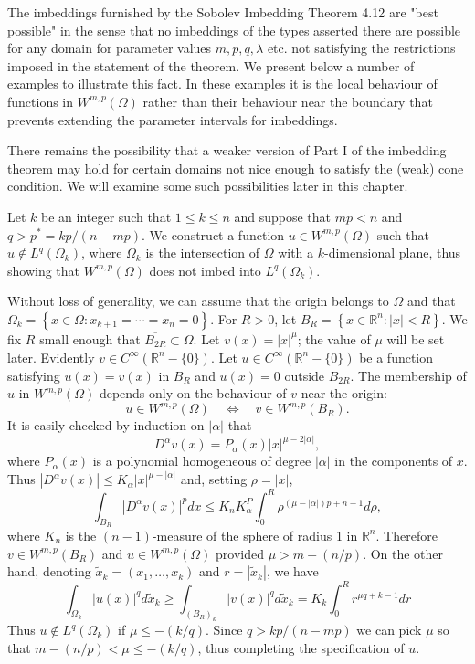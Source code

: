 \begin{para}
  The imbeddings furnished by the Sobolev Imbedding Theorem 4.12 are "best possible" in the sense that no imbeddings of the types asserted there are possible for any domain for parameter values $m, p, q, \lambda$ etc. not satisfying the restrictions imposed in the statement of the theorem. We present below a number of examples to illustrate this fact. In these examples it is the local behaviour of functions in $W^{m, p}(\Omega)$ rather than their behaviour near the boundary that prevents extending the parameter intervals for imbeddings.
  
  There remains the possibility that a weaker version of Part I of the imbedding theorem may hold for certain domains not nice enough to satisfy the (weak) cone condition. We will examine some such possibilities later in this chapter.
\end{para}


\begin{example}
  Let $k$ be an integer such that $1 \leq k \leq n$ and suppose that $m p<n$ and $q>p^*=k p /(n-m p)$. We construct a function $u \in W^{m, p}(\Omega)$ such that $u \notin L^q\left(\Omega_k\right)$, where $\Omega_k$ is the intersection of $\Omega$ with a $k$-dimensional plane, thus showing that $W^{m, p}(\Omega)$ does not imbed into $L^q\left(\Omega_k\right)$.
  
  Without loss of generality, we can assume that the origin belongs to $\Omega$ and that $\Omega_k=\left\{x \in \Omega: x_{k+1}=\cdots=x_n=0\right\}$. For $R>0$, let $B_R=\left\{x \in \mathbb{R}^n:|x|<R\right\}$. We fix $R$ small enough that $\overline{B_{2 R}} \subset \Omega$. Let $v(x)=|x|^\mu$; the value of $\mu$ will be set later. Evidently $v \in C^{\infty}\left(\mathbb{R}^n-\{0\}\right)$. Let $u \in C^{\infty}\left(\mathbb{R}^n-\{0\}\right)$ be a function satisfying $u(x)=v(x)$ in $B_R$ and $u(x)=0$ outside $B_{2 R}$. The membership of $u$ in $W^{m, p}(\Omega)$ depends only on the behaviour of $v$ near the origin:
  \[
  u \in W^{m, p}(\Omega) \quad \Longleftrightarrow \quad v \in W^{m, p}\left(B_R\right) .
  \]
  It is easily checked by induction on $|\alpha|$ that
  \[
  D^\alpha v(x)=P_\alpha(x)|x|^{\mu-2|\alpha|},
  \]
  where $P_\alpha(x)$ is a polynomial homogeneous of degree $|\alpha|$ in the components of $x$. Thus $\left|D^\alpha v(x)\right| \leq K_\alpha|x|^{\mu-|\alpha|}$ and, setting $\rho=|x|$,
  \[
  \int_{B_R}\left|D^\alpha v(x)\right|^p d x \leq K_n K_\alpha^P \int_0^R \rho^{(\mu-|\alpha|) p+n-1} d \rho,
  \]
  where $K_n$ is the $(n-1)$-measure of the sphere of radius 1 in $\mathbb{R}^n$. Therefore $v \in W^{m, p}\left(B_R\right)$ and $u \in W^{m, p}(\Omega)$ provided $\mu>m-(n / p)$.
  On the other hand, denoting $\tilde{x}_k=\left(x_1, \ldots, x_k\right)$ and $r=\left|\tilde{x}_k\right|$, we have
  \[
  \int_{\Omega_k}|u(x)|^q d \tilde{x}_k \geq \int_{\left(B_R\right)_k}|v(x)|^q d \tilde{x}_k=K_k \int_0^R r^{\mu q+k-1} d r
  \]
  Thus $u \notin L^q\left(\Omega_k\right)$ if $\mu \leq-(k / q)$.
  Since $q>k p /(n-m p)$ we can pick $\mu$ so that $m-(n / p)<\mu \leq-(k / q)$, thus completing the specification of $u$.
\end{example}

